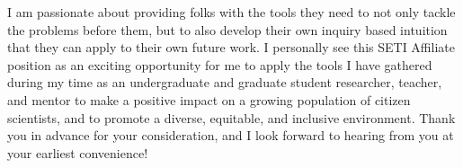 \documentclass[11pt, a4paper]{awesome-cv}
\begin{document}
\begin{cvletter}
I am passionate about providing folks with the tools they need to not only tackle the problems
before them, but to also develop their own inquiry based intuition that they can apply to their own future work. I personally see this SETI Affiliate position as an exciting
opportunity for me to apply the tools I have gathered during my time as an undergraduate and
graduate student researcher, teacher, and mentor to make a positive impact on a growing population of citizen scientists, and to promote a diverse, equitable, and inclusive environment. Thank
you in advance for your consideration, and I look forward to hearing from you at your earliest
convenience!
\end{cvletter}


\makeletterclosing
\end{document}

